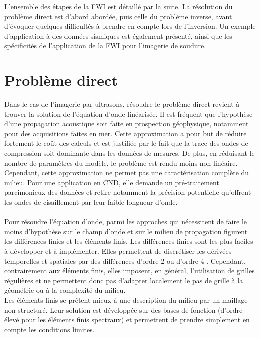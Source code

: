 L'ensemble des étapes de la FWI est détaillé par la suite. La résolution du problème direct est d'abord abordée, puis celle du problème inverse, avant d'évoquer quelques difficultés à prendre en compte lors de l'inversion. Un exemple d'application à des données sismiques est également présenté, ainsi que les spécificités de l'application de la FWI pour l'imagerie de soudure. \\



\section{Problème direct \label{pd_dir}}

Dans le cas de l'imagerie par ultrasons, résoudre le problème direct revient à trouver la solution de l'équation d'onde linéarisée. Il est fréquent que l'hypothèse d'une propagation acoustique soit faite en prospection géophysique, notamment pour des acquisitions faites en mer. Cette approximation a pour but de réduire fortement le coût des calculs et est justifiée par le fait que la trace des ondes de compression soit dominante dans les données de mesures. De plus, en réduisant le nombre de paramètres du modèle, le problème est rendu moins non-linéaire. Cependant, cette approximation ne permet pas une caractérisation complète du milieu. Pour une application en CND, elle demande un pré-traitement parcimonieux des données et retire notamment la précision potentielle qu'offrent les ondes de cisaillement par leur faible longueur d'onde.\\~\\




 Pour résoudre l'équation d'onde, parmi les approches qui nécessitent de faire le moins d'hypothèse sur le champ d'onde et sur le milieu de propagation figurent les différences finies et les éléments finis. Les différences finies sont les plus faciles à développer et à implémenter. Elles permettent de discrétiser les dérivées temporelles et spatiales par des différences d'ordre 2 \citep{virieux_86} ou d'ordre 4 \citep{levander}. Cependant, contrairement aux éléments finis, elles imposent, en général, l'utilisation de grilles régulières et ne permettent donc pas d'adapter localement le pas de grille à la géométrie ou à la complexité du milieu. \\ Les éléments finis se prêtent mieux à une description du milieu par un maillage non-structuré. Leur solution est développée sur des bases de fonction (d'ordre élevé pour les éléments finis spectraux) et permettent de prendre simplement en compte les conditions limites.\\
 
